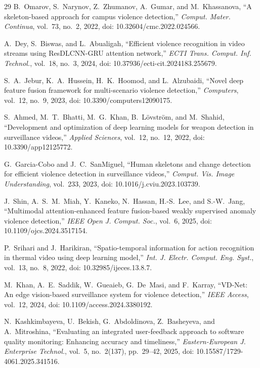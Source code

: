 \documentclass[conference]{IEEEtran}
\begin{document}
\begin{thebibliography}{29}
 B.~Omarov, S.~Narynov, Z.~Zhumanov, A.~Gumar, and M.~Khassanova, ``A skeleton-based approach for campus violence detection,'' \textit{Comput. Mater. Continua}, vol.~73, no.~2, 2022, doi: 10.32604/cmc.2022.024566.

 A.~Dey, S.~Biswas, and L.~Abualigah, ``Efficient violence recognition in video streams using ResDLCNN-GRU attention network,'' \textit{ECTI Trans. Comput. Inf. Technol.}, vol.~18, no.~3, 2024, doi: 10.37936/ecti-cit.2024183.255679.

 S.~A.~Jebur, K.~A.~Hussein, H.~K.~Hoomod, and L.~Alzubaidi, ``Novel deep feature fusion framework for multi-scenario violence detection,'' \textit{Computers}, vol.~12, no.~9, 2023, doi: 10.3390/computers12090175.

 S.~Ahmed, M.~T.~Bhatti, M.~G.~Khan, B.~L\"{o}vstr\"{o}m, and M.~Shahid, ``Development and optimization of deep learning models for weapon detection in surveillance videos,'' \textit{Applied Sciences}, vol.~12, no.~12, 2022, doi: 10.3390/app12125772.

 G.~Garcia-Cobo and J.~C.~SanMiguel, ``Human skeletons and change detection for efficient violence detection in surveillance videos,'' \textit{Comput. Vis. Image Understanding}, vol.~233, 2023, doi: 10.1016/j.cviu.2023.103739.

 J.~Shin, A.~S.~M.~Miah, Y.~Kaneko, N.~Hassan, H.-S.~Lee, and S.-W.~Jang, ``Multimodal attention-enhanced feature fusion-based weakly supervised anomaly violence detection,'' \textit{IEEE Open J. Comput. Soc.}, vol.~6, 2025, doi: 10.1109/ojcs.2024.3517154.

 P.~Srihari and J.~Harikiran, ``Spatio-temporal information for action recognition in thermal video using deep learning model,'' \textit{Int. J. Electr. Comput. Eng. Syst.}, vol.~13, no.~8, 2022, doi: 10.32985/ijeces.13.8.7.

 M.~Khan, A.~E.~Saddik, W.~Gueaieb, G.~De~Masi, and F.~Karray, ``VD-Net: An edge vision-based surveillance system for violence detection,'' \textit{IEEE Access}, vol.~12, 2024, doi: 10.1109/access.2024.3380192.

 N.~Kashkimbayeva, U.~Bekish, G.~Abdoldinova, Z.~Basheyeva, and A.~Mitroshina, ``Evaluating an integrated user-feedback approach to software quality monitoring: Enhancing accuracy and timeliness,'' \textit{Eastern-European J. Enterprise Technol.}, vol.~5, no.~2(137), pp.~29--42, 2025, doi: 10.15587/1729-4061.2025.341516.


\end{thebibliography}
\end{document}
